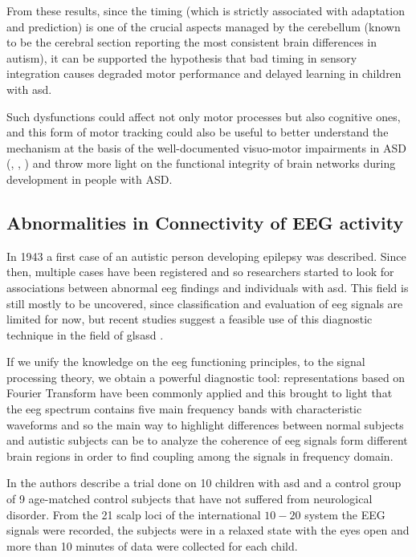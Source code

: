 \documentclass[12pt,journal,draftclsnofoot,onecolumn]{IEEEtran}
\makeatletter
\let\origsubsubsection\subsubsection
\renewcommand\subsubsection{\@ifstar{\starsubsubsection}{\nostarsubsubsection}}
\newcommand\nostarsubsubsection[1]
{\subsubsectionprelude\origsubsubsection{#1}}
\newcommand\subsubsectionprelude{%
  \vspace{6pt}
}
\makeatother
\begin{document}
From these results, since the timing (which is strictly associated with adaptation and prediction) is one of the crucial aspects managed by the cerebellum (known to be the cerebral section reporting the most consistent brain differences in autism), it can be supported the hypothesis that bad timing in sensory integration causes degraded motor performance and delayed learning in children with \gls{asd}.

Such dysfunctions could affect not only motor processes but also cognitive ones, and this form of motor tracking could also be useful to better understand the mechanism at the basis of the well-documented visuo-motor impairments in ASD (\cite{Chow2010}, \cite{Green2013}, \cite{Papa}) and throw more light on the functional integrity of brain networks during development in people with ASD.

\subsection{Abnormalities in Connectivity of EEG activity}
\label{sec:EEG}

In 1943 a first case of an autistic person developing epilepsy was described. Since then, multiple cases have been registered and so researchers started to look for associations between abnormal \gls{eeg} findings and individuals with \gls{asd}. This field is still mostly to be uncovered, since classification and evaluation of \gls{eeg} signals are limited for now, but recent studies suggest a feasible use of this diagnostic technique in the field of gls{asd} \cite{Behnam2008}.

If we unify the knowledge on the \gls{eeg} functioning principles, to the signal processing theory, we obtain a powerful diagnostic tool: representations based on Fourier Transform have been commonly applied and this brought to light that the \gls{eeg} spectrum contains five main frequency bands with characteristic waveforms and so the main way to highlight differences between normal subjects and autistic subjects can be to analyze the coherence of \gls{eeg} signals form different brain regions in order to find coupling among the signals in frequency domain.

\subsubsection{Example of procedure}
\label{sec:procEEG}

In \cite{Behnam2008} the authors describe a trial done on 10 children with \gls{asd} and a control group of 9 age-matched control subjects that have not suffered from neurological disorder. From the 21 scalp loci of the international $10 - 20$ system the EEG signals were recorded, the subjects were in a relaxed state with the eyes open and more than 10 minutes of data were collected for each child.
\end{document}
